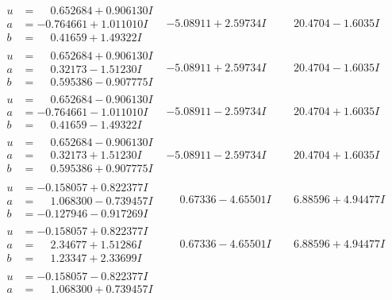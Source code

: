 \documentclass[1p]{elsarticle_modified}
\theoremstyle{definition}
\begin{document}
$$\begin{array}{c|c|c}
 \hline 
\begin{aligned}
u &= \phantom{-}0.652684 + 0.906130 I \\
a &= -0.764661 + 1.011010 I \\
b &= \phantom{-}0.41659 + 1.49322 I\end{aligned}
 & -5.08911 + 2.59734 I & \phantom{-}20.4704 - 1.6035 I \\ \hline\begin{aligned}
u &= \phantom{-}0.652684 + 0.906130 I \\
a &= \phantom{-}0.32173 - 1.51230 I \\
b &= \phantom{-}0.595386 - 0.907775 I\end{aligned}
 & -5.08911 + 2.59734 I & \phantom{-}20.4704 - 1.6035 I \\ \hline\begin{aligned}
u &= \phantom{-}0.652684 - 0.906130 I \\
a &= -0.764661 - 1.011010 I \\
b &= \phantom{-}0.41659 - 1.49322 I\end{aligned}
 & -5.08911 - 2.59734 I & \phantom{-}20.4704 + 1.6035 I \\ \hline\begin{aligned}
u &= \phantom{-}0.652684 - 0.906130 I \\
a &= \phantom{-}0.32173 + 1.51230 I \\
b &= \phantom{-}0.595386 + 0.907775 I\end{aligned}
 & -5.08911 - 2.59734 I & \phantom{-}20.4704 + 1.6035 I \\ \hline\begin{aligned}
u &= -0.158057 + 0.822377 I \\
a &= \phantom{-}1.068300 - 0.739457 I \\
b &= -0.127946 - 0.917269 I\end{aligned}
 & \phantom{-}0.67336 - 4.65501 I & \phantom{-}6.88596 + 4.94477 I \\ \hline\begin{aligned}
u &= -0.158057 + 0.822377 I \\
a &= \phantom{-}2.34677 + 1.51286 I \\
b &= \phantom{-}1.23347 + 2.33699 I\end{aligned}
 & \phantom{-}0.67336 - 4.65501 I & \phantom{-}6.88596 + 4.94477 I \\ \hline\begin{aligned}
u &= -0.158057 - 0.822377 I \\
a &= \phantom{-}1.068300 + 0.739457 I \\

\end{aligned}
\end{array}$$
\end{document}

